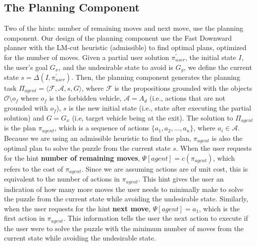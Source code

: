 \subsection*{The Planning Component}
Two of the hints: number of remaining moves and next move, use the planning component. Our design of the planning component use the Fast Downward planner \cite{helmert2006} with the LM-cut heuristic (admissible) to find optimal plans, optimized for the number of moves. Given a partial user solution $\pi^\prime _{user}$, the initial state $I$, the user's goal $G_x$, and the undesirable state to avoid is $G_y$, we define the current state $s = \Delta (I,\pi^\prime _{user})$. Then, the planning component generates the planning task $\Pi_{agent} = \langle \mathcal{F}, \mathcal{A}, s, G \rangle$, where $\mathcal{F}$ is the propositions grounded with the objects $\mathcal{O}\setminus o_f$ where $o_f$ is the forbidden vehicle, $\mathcal{A}=A_d$ (i.e., actions that are not grounded with $o_f$), $s$ is the new initial state (i.e., state after executing the partial solution) and $G = G_x$ (i.e, target vehicle being at the exit).
The solution to $\Pi_{agent}$ is the plan $\pi_{agent}$, which is a sequence of actions $\lbrace a_1, a_2, \ldots, a_n\rbrace$, where $a_i \in \mathcal{A}$. Because we are using an admissible heuristic to find the plan, $\pi_{agent}$ is also the optimal plan to solve the puzzle from the current state $s$. When the user requests for the hint \textbf{number of remaining moves}, $\Psi[agent]=c(\pi_{agent})$, which refers to the cost of $\pi_{agent}$. Since we are assuming actions are of unit cost, this is equivalent to the number of actions in $\pi_{agent}$. This hint gives the user an indication of how many more moves the user needs to minimally make to solve the puzzle from the current state while avoiding the undesirable state. Similarly, when the user requests for the hint \textbf{next move}, $\Psi[agent]=a_1$, which is the first action in $\pi_{agent}$. This information tells the user the next action to execute if the user were to solve the puzzle with the minimum number of moves from the current state while avoiding the undesirable state.

